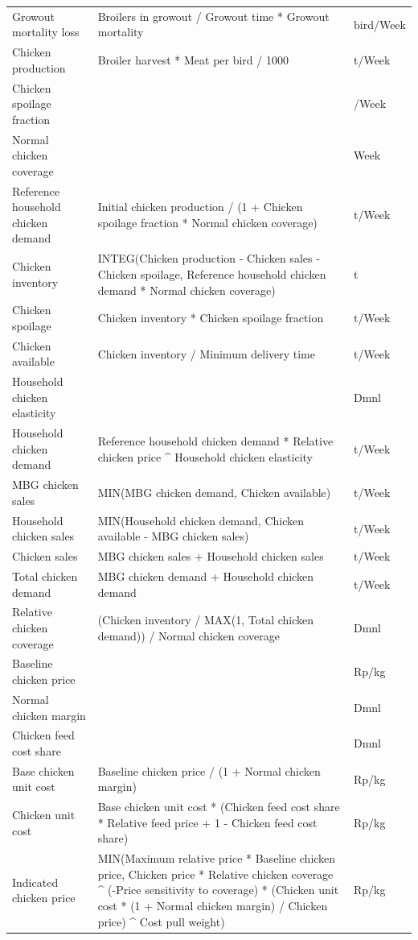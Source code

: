 \documentclass[10pt,twocolumn,a4paper]{article}
\begin{document}
\begin{longtable}{>{\raggedright\arraybackslash}p{4.2cm}>{\raggedright\arraybackslash\ttfamily}p{8.9cm}>{\raggedright\arraybackslash}p{2.4cm}}
Growout mortality loss & Broilers in growout / Growout time * Growout mortality & bird/Week \\
Chicken production & Broiler harvest * Meat per bird / 1000 & t/Week \\
Chicken spoilage fraction & 0.02 & 1/Week \\
Normal chicken coverage & 1 & Week \\
Reference household chicken demand & Initial chicken production / (1 + Chicken spoilage fraction * Normal chicken coverage) & t/Week \\
Chicken inventory & INTEG(Chicken production - Chicken sales - Chicken spoilage, Reference household chicken demand * Normal chicken coverage) & t \\
Chicken spoilage & Chicken inventory * Chicken spoilage fraction & t/Week \\
Chicken available & Chicken inventory / Minimum delivery time & t/Week \\
Household chicken elasticity & -1.581 & Dmnl \\
Household chicken demand & Reference household chicken demand * Relative chicken price \textasciicircum{} Household chicken elasticity & t/Week \\
MBG chicken sales & MIN(MBG chicken demand, Chicken available) & t/Week \\
Household chicken sales & MIN(Household chicken demand, Chicken available - MBG chicken sales) & t/Week \\
Chicken sales & MBG chicken sales + Household chicken sales & t/Week \\
Total chicken demand & MBG chicken demand + Household chicken demand & t/Week \\
Relative chicken coverage & (Chicken inventory / MAX(1, Total chicken demand)) / Normal chicken coverage & Dmnl \\
Baseline chicken price & 35704 & Rp/kg \\
Normal chicken margin & 0.1 & Dmnl \\
Chicken feed cost share & 0.65 & Dmnl \\
Base chicken unit cost & Baseline chicken price / (1 + Normal chicken margin) & Rp/kg \\
Chicken unit cost & Base chicken unit cost * (Chicken feed cost share * Relative feed price + 1 - Chicken feed cost share) & Rp/kg \\
Indicated chicken price & MIN(Maximum relative price * Baseline chicken price, Chicken price * Relative chicken coverage \textasciicircum{} (-Price sensitivity to coverage) * (Chicken unit cost * (1 + Normal chicken margin) / Chicken price) \textasciicircum{} Cost pull weight) & Rp/kg \\

\end{longtable}
\end{document}
